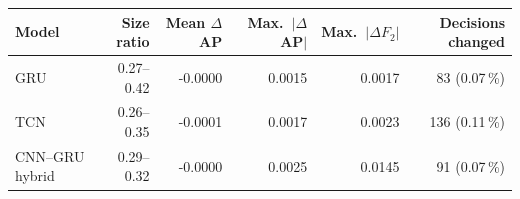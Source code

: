 \begin{tabular}{lrrrrr}
\toprule
Model & Size ratio & Mean $\Delta$AP & Max.\ $|\Delta$AP$|$ & Max.\ $|\Delta F_2|$ & Decisions changed \\
\midrule
GRU & 0.27--0.42 & -0.0000 & 0.0015 & 0.0017 & 83 (0.07\,\%) \\
TCN & 0.26--0.35 & -0.0001 & 0.0017 & 0.0023 & 136 (0.11\,\%) \\
CNN--GRU hybrid & 0.29--0.32 & -0.0000 & 0.0025 & 0.0145 & 91 (0.07\,\%) \\
\bottomrule
\end{tabular}